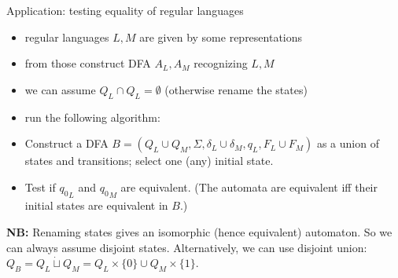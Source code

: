 \documentclass[handout]{beamer}
\begin{document}
\begin{frame}{Application: testing equality of regular languages}

    \begin{itemize}
        \item regular languages $L,M$ are given by some representations
        \item from those construct DFA $A_L,A_M$ recognizing $L,M$
        \item we can assume $Q_L\cap Q_L=\emptyset$ (otherwise rename the states)
        \item run the following algorithm:
    \end{itemize}
    
    \begin{algorithm}
        \begin{itemize}
            \item Construct a DFA \alert{$B=(Q_L\cup Q_M, \Sigma, \delta_L\cup \delta_M,q_L, F_L\cup F_M)$} as a union of states and transitions; select one (any) initial state.
            \item Test if ${q_{0}}_L$ and ${q_{0}}_M$ are equivalent.
            (The automata are equivalent iff their initial states are equivalent in $B$.)                
        \end{itemize}
    \end{algorithm}
        
    \textbf{NB:} Renaming states gives an isomorphic (hence equivalent) automaton. So we can always assume disjoint states. Alternatively, we can use disjoint union: $Q_B=Q_L\dot\sqcup Q_M=Q_L\times\{0\}\cup Q_M\times\{1\}$.
    
\end{frame}
\end{document}
